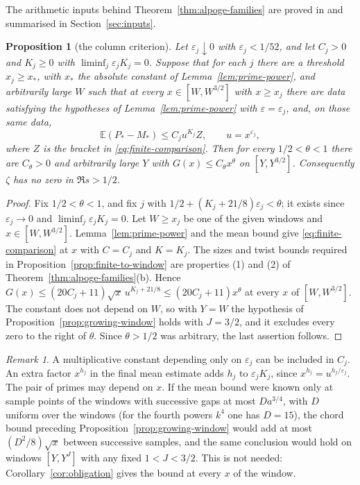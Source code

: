 \documentclass[10pt]{amsart}
\newtheorem{proposition}[theorem]{Proposition}
\theoremstyle{definition}
\theoremstyle{remark}
\newtheorem{remark}[theorem]{Remark}
\begin{document}
The arithmetic inputs behind Theorem~\ref{thm:alpoge-families} are proved in
\cite[Sections~\ref{A-i1:sec}--\ref{A-i4:sec}]{Annex} and summarised in
Section~\ref{sec:inputs}.

\begin{proposition}[the column criterion]\label{prop:simultaneous-slope}
Let $\varepsilon_j\downarrow0$ with $\varepsilon_j<1/52$, and let $C_j>0$
and $K_j\ge0$ with $\liminf_j\varepsilon_jK_j=0$. Suppose that for each $j$
there are a threshold $x_j\ge x_*$, with $x_*$ the absolute constant of
Lemma~\ref{lem:prime-power}, and arbitrarily large $W$ such that at every
$x\in[W,W^{3/2}]$ with $x\ge x_j$ there are data satisfying the hypotheses
of Lemma~\ref{lem:prime-power} with $\varepsilon=\varepsilon_j$, and, on
those same data,
\[
 \mathbb E(P_*-M_*)\le C_j u^{K_j} Z,\qquad u=x^{\varepsilon_j},
\]
where $Z$ is the bracket in \eqref{eq:finite-comparison}. Then for every
$1/2<\theta<1$ there are $C_\theta>0$ and arbitrarily large $Y$ with
$G(x)\le C_\theta x^\theta$ on $[Y,Y^{3/2}]$. Consequently $\zeta$ has no
zero in $\Re s>1/2$.
\end{proposition}
\begin{proof}
Fix $1/2<\theta<1$, and fix $j$ with
$1/2+(K_j+21/8)\varepsilon_j<\theta$; it exists since $\varepsilon_j\to0$
and $\liminf_j\varepsilon_jK_j=0$. Let $W\ge x_j$ be one of the given
windows and $x\in[W,W^{3/2}]$. Lemma~\ref{lem:prime-power} and the mean
bound give \eqref{eq:finite-comparison} at $x$ with $C=C_j$ and $K=K_j$.
The sizes and twist bounds required in
Proposition~\ref{prop:finite-to-window} are properties (1) and (2) of
Theorem~\ref{thm:alpoge-families}(b). Hence
$G(x)\le(20C_j+11)\sqrt{x}\,u^{K_j+21/8}\le(20C_j+11)x^\theta$ at every $x$
of $[W,W^{3/2}]$. The constant does not depend on $W$, so with $Y=W$ the
hypothesis of Proposition~\ref{prop:growing-window} holds with $J=3/2$, and
it excludes every zero to the right of $\theta$. Since $\theta>1/2$ was
arbitrary, the last assertion follows.
\end{proof}

\begin{remark}\label{rem:simultaneous-slope}
A multiplicative constant depending only on $\varepsilon_j$ can be included
in $C_j$. An extra factor $x^{h_j}$ in the final mean estimate adds $h_j$ to
$\varepsilon_jK_j$, since $x^{h_j}=u^{h_j/\varepsilon_j}$. The pair of
primes may depend on $x$. If the mean bound were known only at sample points
of the windows with successive gaps at most $Da^{3/4}$, with $D$ uniform
over the windows (for the fourth powers $k^4$ one has $D=15$), the chord
bound preceding Proposition~\ref{prop:growing-window} would add at most
$(D^2/8)\sqrt{x}$ between successive samples, and the same conclusion would
hold on windows $[Y,Y^{J}]$ with any fixed $1<J<3/2$. This is not needed:
Corollary~\ref{cor:obligation} gives the bound at every $x$ of the window.
\end{remark}
\end{document}
